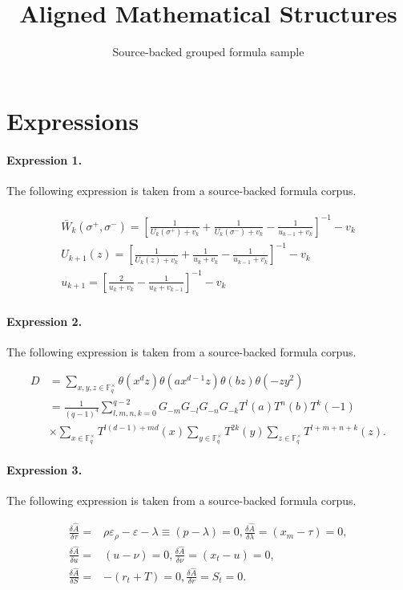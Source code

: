 \documentclass[11pt]{article}
\title{Aligned Mathematical Structures}
\author{Source-backed grouped formula sample}
\date{}
\begin{document}
\maketitle
\section{Expressions}
\paragraph{Expression 1.} The following expression is taken from a source-backed formula corpus.

\begin{align*}\begin{array}{c}\bar W_k(\sigma ^{+},\sigma ^{-})=\left[ \frac 1{U_k(\sigma ^{+})+v_k}+\frac1{U_k(\sigma ^{-})+v_k}-\frac 1{u_{k-1}+v_k}\right] ^{-1}-v_k \\U_{k+1}(z)=\left[ \frac 1{U_k(z)+v_k}+\frac 1{u_k+v_k}-\frac1{u_{k-1}+v_k}\right] ^{-1}-v_k \\u_{k+1}=\left[ \frac 2{u_k+v_k}-\frac 1{u_k+v_{k-1}}\right] ^{-1}-v_k\end{array}\end{align*}

\paragraph{Expression 2.} The following expression is taken from a source-backed formula corpus.

\begin{align*}D&=\sum_{x,y,z\in\mathbb{F}_{q}^{\times}}\theta(x^dz)\theta(ax^{d-1}z)\theta(bz)\theta(-zy^2)\\&=\frac{1}{(q-1)^4}\sum_{l,m,n,k=0}^{q-2}G_{-m}G_{-l}G_{-n}G_{-k}T^l(a)T^n(b)T^k(-1)\\&\times\sum_{x\in\mathbb{F}_{q}^{\times}}T^{l(d-1)+md}(x)\sum_{y\in\mathbb{F}_{q}^{\times}}T^{2k}(y)\sum_{z\in\mathbb{F}_{q}^{\times}}T^{l+m+n+k}(z).\end{align*}

\paragraph{Expression 3.} The following expression is taken from a source-backed formula corpus.

\begin{align*}\frac{\delta \hat{A}}{\delta\tau}=&\rho\varepsilon_\rho-\varepsilon-\lambda\equiv (p-\lambda)=0, \frac{\delta \hat{A}}{\delta\lambda}=(x_m-\tau)=0, \\\frac{\delta\hat{A}}{\delta u}=&(u-\nu)=0,\frac{\delta\hat{A}}{\delta\nu}=(x_t-u)=0, \\\frac{\delta\hat{A}}{\delta S}=&-\left(r_t+T\right)=0,\frac{\delta\hat{A}}{\delta r}=S_t=0. \end{align*}
\end{document}
